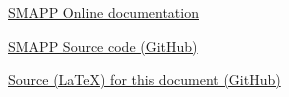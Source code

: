 \href{http://smapp.sorters.io/docs}{SMAPP Online documentation}

\href{https://github.com/sorters/smapp}{SMAPP Source code (GitHub)}

\href{https://github.com/sorters/smapp-doc}{Source (\LaTeX) for this document (GitHub)}